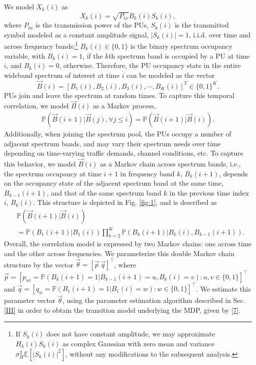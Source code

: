 \documentclass[10pt,twocolumn]{IEEEtran}
\begin{document}
We model $X_k(i)$ as
\begin{equation}\label{4}
    X_k(i) = \sqrt{P_{tx}}B_k(i)S_k(i),
\end{equation}
where $P_{tx}$ is the transmission power of the PUs, $S_k(i)$ is the transmitted symbol modeled as a constant amplitude signal, $|S_k(i)|{=}1$, i.i.d. over time and across frequency bands;\footnote{If $S_k(i)$ does not have constant amplitude, we may approximate $H_{k}(i)S_{k}(i)$ as complex Gaussian with zero mean and variance $\sigma_H^2\mathbb E[|S_{k}(i)|^2]$, without any modifications to the subsequent analysis.} $B_k(i){\in}\{0,1\}$ is the binary spectrum occupancy variable, with $B_k(i){=}1$, if the $k$th spectrum band is occupied by a PU at time $i$, and $B_k(i){=}0$, otherwise. Therefore, the PU occupancy state in the entire wideband spectrum of interest at time $i$ can be modeled as the vector 
\begin{equation}\label{5}
    \vec{B}(i) = [B_1(i), B_2(i), B_3(i), \cdots, B_K(i)]^T {\in} \{0, 1\}^K.
\end{equation}
PUs join and leave the spectrum at random times. To capture this temporal correlation, we model $\vec{B}(i)$ as a Markov process,
\begin{equation}\label{6}
    \begin{aligned}
        \mathbb{P}(\vec{B}(i+1)|\vec{B}(j), \forall j \leq i) = \mathbb{P}(\vec{B}(i+1)|\vec{B}(i)).
    \end{aligned}
\end{equation}
Additionally, when joining the spectrum pool, the PUs occupy a number of adjacent spectrum bands, and may vary their spectrum needs over time depending on time-varying traffic demands, channel conditions, etc. To capture this behavior, we model $\vec{B}(i)$ as a Markov chain across spectrum bands, i.e., the spectrum occupancy at time $i{+}1$ in frequency band $k$, $B_{k}(i{+}1)$, depends on the occupancy state of the adjacent spectrum band at the same time, $B_{k{-}1}(i{+}1)$, and that of the same spectrum band $k$ in the previous time index $i$, $B_{k}(i)$. This structure is depicted in Fig. \ref{fig:1}, and is described as
\begin{align}\label{7}
&         \mathbb{P}(\vec{B}(i+1)|\vec{B}(i))\\&=
\nonumber
         \mathbb{P}(B_{1}(i+1)|B_{1}(i))
         \prod_{k=2}^{K} \mathbb{P}(B_{k}(i+1)|B_{k}(i), B_{k-1}(i+1)).
\end{align}
Overall, the correlation model is expressed by two Markov chains: one across time and the other across frequencies. We parameterize this double Markov chain structure by the vector $\vec{\theta}{=}[\vec{p}\ \vec{q}]^\intercal$, where $\vec{p}{=}[p_{uv}{=}\mathbb{P}(B_{k}(i{+}1){=}1|B_{k{-}1}(i{+}1){=}u,B_{k}(i){=}v){:} u,v{\in}\{0,1\}]^{\intercal}$ and $\vec{q}{=}[q_{w}{=}\mathbb{P}(B_{1}(i{+}1){=}1|B_{1}(i){=}w){:}w{\in}\{0,1\}]^\intercal$. We estimate this parameter vector $\vec{\theta}$, using the parameter estimation algorithm described in Sec. \ref{III} in order to obtain the transition model underlying the MDP, given by \eqref{7}.
\end{document}
